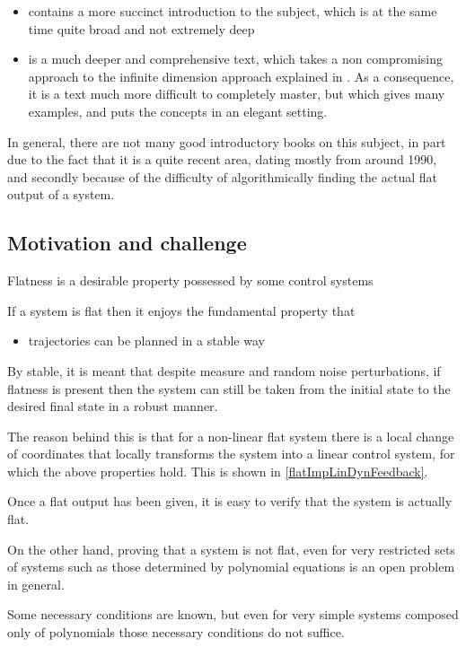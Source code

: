 \documentclass[12pt]{article}
\begin{document}
\begin{itemize}

\item \cite{MR99} contains a more succinct introduction to the subject, which is at the same time quite broad and not extremely deep

\item \cite{Le09} is a much deeper and comprehensive text, which takes
a non compromising approach to the infinite dimension approach explained
in \label{secInfiniteDimesionSpace}. As a consequence, it is a text much
more difficult to completely master, but which gives many examples, and
puts the concepts in an elegant setting.

\end{itemize}

In general, there are not many good introductory books on this subject, in part due to
the fact that it is a quite recent area, dating mostly from around 1990,
and secondly because of the difficulty of algorithmically finding the actual flat output of a system.

\subsection{Motivation and challenge}

\begin{remark}\label{interestOfFlatness}

  Flatness is a desirable property possessed by some control systems 
  
  If a system is flat then it enjoys the fundamental property that
  \begin{itemize}
    \item trajectories can be planned in a stable way
  \end{itemize}
  
  By stable, it is meant that despite measure and random noise perturbations, if
  flatness is present then the system can still be taken from the initial state to
  the desired final state in a robust manner.
  
  The reason behind this is that for a non-linear flat system there is a local
  change of coordinates that locally transforms the system into a linear
  control system, for which the above properties hold. This is shown in
  \ref{flatImpLinDynFeedback}.
\end{remark}

\begin{open-question}
  Once a flat output has been given, it is easy to verify that the system is actually flat.
  
  On the other hand, proving that a system is not flat, even for very restricted
  sets of systems such as those determined by polynomial equations is an open problem in general.
  
  Some necessary conditions are known, but even for very simple systems composed
  only of polynomials those necessary conditions do not suffice.
\end{open-question}
\end{document}
